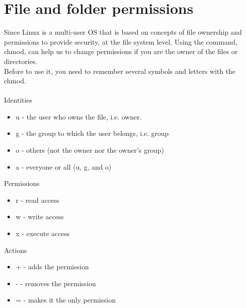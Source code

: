 \section{File and folder permissions}
Since Linux is a multi-user OS that is based on concepts of file ownership and permissions to provide security, at the file system level. Using the command, chmod, can help us to change permissions if you are the owner of the files or directories.\\
Before to use it, you need to remember several symbols and letters with the chmod. \\
\\
Identities
\begin{itemize}
\item u - the user who owns the file, i.e. owner.
\item g - the group to which the user belongs, i.e. group
\item o - others (not the owner nor the owner's group)
\item a - everyone or all (u, g, and o)
\end{itemize}

Permissions
\begin{itemize}
\item r - read access
\item w - write access
\item x - execute access
\end{itemize}

Actions
\begin{itemize}
\item + - adds the permission
\item - - removes the permission
\item = - makes it the only permission
\end{itemize}

